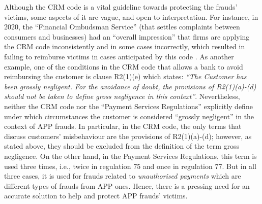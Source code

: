 


Although the CRM code is a vital guideline towards protecting the frauds' victims, some aspects of it are vague, and open to interpretation. For instance, in 2020, the ``Financial Ombudsman Service'' (that settles complaints between consumers and businesses)  had an ``overall impression'' that firms are applying the CRM code inconsistently and in some cases incorrectly, which resulted in failing to reimburse victims in cases anticipated by this code \cite{Financial-Ombudsman-Service-response}.
%
 As another example, one of the conditions in the CRM code that allows a bank to avoid reimbursing the customer is clause R2(1)(e) which states: \textit{``The Customer has been grossly negligent. For the avoidance of doubt, the provisions of R2(1)(a)-(d) should not be taken to define gross negligence in this context''}.  Nevertheless, neither the CRM code nor the ``Payment Services Regulations'' \cite{Regulations}   explicitly define under which circumstances the customer is considered ``grossly negligent'' in the context of  APP frauds. In particular, in the CRM code, the only terms that discuss customers' misbehaviour are the provisions of R2(1)(a)-(d); however, as stated above, they should be excluded from the definition of the term gross negligence. On the other hand,  in the Payment Services Regulations, this term is used three times, i.e.,  twice in regulation 75 and once in regulation 77. But in all three cases, it is used for frauds related to \emph{unauthorised payments} which are different types of frauds from  APP ones. Hence, there is a pressing need for an accurate solution to help and protect  APP frauds' victims. 


